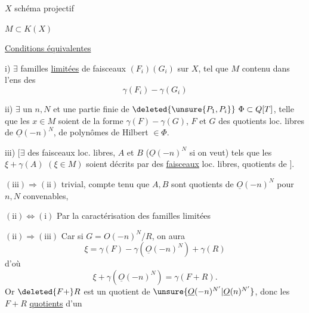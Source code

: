 $X$ schéma projectif

$M\subset K(X)$

\uline{Conditions équivalentes}

i) $\exists$ familles \uline{limitées} de faisceaux  $(F_i)(G_i)$ sur $X$, tel que $M$ contenu dans l'ens des
\[
\gamma(F_i)-\gamma(G_i)
\]

ii) $\exists$ un $n,N$ et une partie finie de  $\deleted{\unsure{P_1,P_i}}\ \Phi\subset Q[T]$, telle que les $x\in M$ soient de la forme $\gamma(F)-\gamma(G)$, $F$ et $G$ des quotients loc. libres de $\underline{O}(-n)^N$, de polynômes de Hilbert $\in\Phi$.

iii) 
$[\exists$ des faisceaux loc. libres, $A$ et $B$ ($\underline{O}(-n)^N$ si on veut) tels que les $\xi+\gamma(A)$ $(\xi\in M)$ soient décrits par des \uline{faisceaux} loc. libres, quotients de   $]$.

$(\mathrm{iii})\Longrightarrow(\mathrm{ii})$ trivial, compte tenu que $A,B$ sont quotients de $\underline{O}(-n)^N$ pour $n,N$ convenables,

$(\mathrm{ii})\Longleftrightarrow(\mathrm{i})$ Par la caractérisation des familles limitées

$(\mathrm{ii})\Longrightarrow(\mathrm{iii})$ Car si $G=O(-n)^N/R$, on aura
\[
\xi=\gamma(F)-\gamma(\underline{O}(-n)^N)+\gamma(R)
\]
d'où
\[
\xi+\gamma(\underline{O}(-n)^N)=\gamma(F+R).
\]
Or $\deleted{F+}R$ est un quotient de $\unsure{\underline{O}(-n)^{N'}|\underline{O}(n)^{N'}}$, donc les $F+R$  \uline{quotients} d'un
